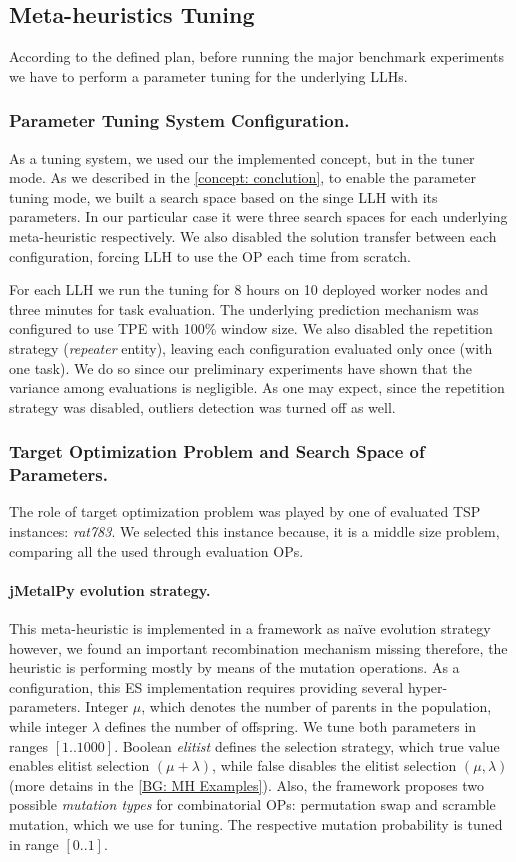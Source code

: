 \subsection{Meta-heuristics Tuning}\label{eval: mh tuning}
According to the defined plan, before running the major benchmark experiments we have to perform a parameter tuning for the underlying LLHs.

\subsubsection{Parameter Tuning System Configuration.} 
As a tuning system, we used our the implemented concept, but in the tuner mode. As we described in the \cref{concept: conclution}, to enable the parameter tuning mode, we built a search space based on the singe LLH with its parameters. In our particular case it were three search spaces for each underlying meta-heuristic respectively. We also disabled the solution transfer between each configuration, forcing LLH to use the OP each time from scratch.

For each LLH we run the tuning for 8 hours on 10 deployed worker nodes and three minutes for task evaluation. The underlying prediction mechanism was configured to use TPE with 100\% window size. We also disabled the repetition strategy (\emph{repeater} entity), leaving each configuration evaluated only once (with one task). We do so since our preliminary experiments have shown that the variance among evaluations is negligible. As one may expect, since the repetition strategy was disabled, outliers detection was turned off as well.

\subsubsection{Target Optimization Problem and Search Space of Parameters.} 
The role of target optimization problem was played by one of evaluated TSP instances: \emph{rat783}. We selected this instance because, it is a middle size problem, comparing all the used through evaluation OPs.

\paragraph{jMetalPy evolution strategy.} This meta-heuristic is implemented in a framework as na\"ive evolution strategy however, we found an important recombination mechanism missing therefore, the heuristic is performing mostly by means of the mutation operations. As a configuration, this ES implementation requires providing several hyper-parameters. Integer $\mu$, which denotes the number of parents in the population, while integer $\lambda$ defines the number of offspring. We tune both parameters in ranges $[1..1000]$. Boolean \emph{elitist} defines the selection strategy, which true value enables elitist selection $(\mu+\lambda)$, while false disables the elitist selection $(\mu,\lambda)$ (more detains in the \cref{BG: MH Examples}). Also, the framework proposes two possible \emph{mutation types} for combinatorial OPs: permutation swap and scramble mutation, which we use for tuning. The respective mutation probability is tuned in range $[0..1]$.

